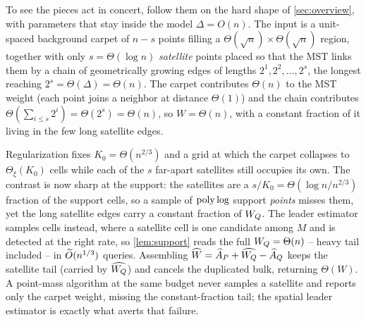 To see the pieces act in concert, follow them on the hard shape of \cref{sec:overview}, with parameters
that stay inside the model $\Delta=O(n)$. The input is a unit-spaced background carpet of $n-s$ points
filling a $\Theta(\sqrt n)\times\Theta(\sqrt n)$ region, together with only $s=\Theta(\log n)$
\emph{satellite} points placed so that the MST links them by a chain of geometrically growing edges of
lengths $2^1,2^2,\dots,2^s$, the longest reaching $2^s=\Theta(\Delta)=\Theta(n)$. The carpet contributes
$\Theta(n)$ to the MST weight (each point joins a neighbor at distance $\Theta(1)$) and the chain
contributes $\Theta(\sum_{i\le s}2^i)=\Theta(2^s)=\Theta(n)$, so $W=\Theta(n)$, with a constant fraction of
it living in the few long satellite edges.

Regularization fixes $K_0=\Theta(n^{2/3})$ and a grid at which the carpet collapses to $\Theta_\xi(K_0)$ cells
while each of the $s$ far-apart satellites still occupies its own. The contrast is now sharp at the
support: the satellites are a $s/K_0=\Theta(\log n/n^{2/3})$ fraction of the support cells, so a sample of
$\operatorname{poly}\log$ support \emph{points} misses them, yet the long satellite edges carry a constant fraction of
$W_Q$. The leader estimator samples cells instead, where a satellite cell is one candidate among $M$ and is
detected at the right rate, so \cref{lem:support} reads the full $W_Q=\Theta(n)$ -- heavy tail included --
in $\widetilde{O}(n^{1/3})$ queries. Assembling $\widehat W=\widehat A_P+\widehat{W_Q}-\widehat A_Q$ keeps the
satellite tail (carried by $\widehat{W_Q}$) and cancels the duplicated bulk, returning $\Theta(W)$. A
point-mass algorithm at the same budget never samples a satellite and reports only the carpet weight,
missing the constant-fraction tail; the spatial leader estimator is exactly what averts that failure.
